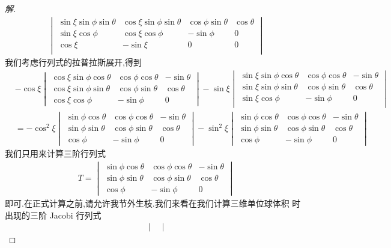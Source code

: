 \documentclass[a4paper, 12pt]{article} %
\begin{document}
\begin{CJK}{UTF8}{gkai}
\begin{proof}[解]
\begin{align*}
\begin{vmatrix}
    \sin\xi\sin\phi\sin\theta&\cos\xi\sin\phi\sin\theta&\cos\phi\sin\theta&\cos\theta\\
    \sin\xi\cos\phi&\cos\xi\cos\phi&-\sin\phi&0\\
    \cos\xi&-\sin\xi&0&0\\
  \end{vmatrix}
\end{align*}
我们考虑行列式的拉普拉斯展开,得到
\begin{align*}
&  -\cos\xi \begin{vmatrix}
    \cos\xi\sin\phi\cos\theta&\cos\phi\cos\theta&-\sin\theta\\
\cos\xi\sin\phi\sin\theta&\cos\phi\sin\theta&\cos\theta\\
\cos\xi\cos\phi&-\sin\phi&0
  \end{vmatrix}-\sin\xi \begin{vmatrix}
    \sin\xi\sin\phi\cos\theta&\cos\phi\cos\theta&-\sin\theta\\
\sin\xi\sin\phi\sin\theta&\cos\phi\sin\theta&\cos\theta\\
\sin\xi\cos\phi&-\sin\phi&0\\
  \end{vmatrix}\\&=-\cos^2\xi \begin{vmatrix}
    \sin\phi\cos\theta&\cos\phi\cos\theta&-\sin\theta\\
\sin\phi\sin\theta&\cos\phi\sin\theta&\cos\theta\\
\cos\phi&-\sin\phi&0
  \end{vmatrix}-\sin^{2}\xi \begin{vmatrix}
    \sin\phi\cos\theta&\cos\phi\cos\theta&-\sin\theta\\
\sin\phi\sin\theta&\cos\phi\sin\theta&\cos\theta\\
\cos\phi&-\sin\phi&0
  \end{vmatrix}
\end{align*}
我们只用来计算三阶行列式
\begin{align*}
T=  \begin{vmatrix}
    \sin\phi\cos\theta&\cos\phi\cos\theta&-\sin\theta\\
\sin\phi\sin\theta&\cos\phi\sin\theta&\cos\theta\\
\cos\phi&-\sin\phi&0
  \end{vmatrix}
\end{align*}
即可.在正式计算之前,请允许我节外生枝.我们来看在我们计算三维单位球体积
时出现的三阶 Jacobi 行列式
\begin{align*}
  \begin{vmatrix}

\end{vmatrix}
\end{align*}
\end{proof}
\end{CJK}
\end{document}

